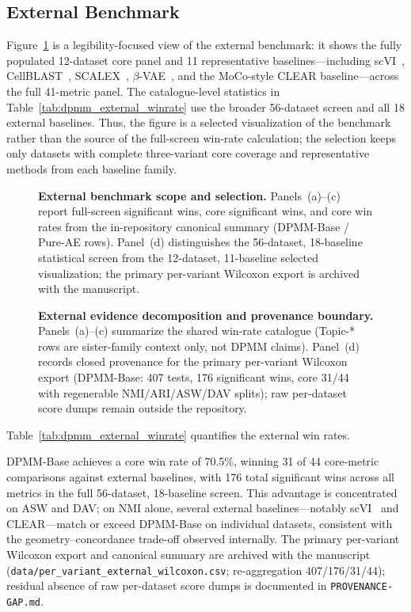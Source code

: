 \documentclass[biology,article,submit,pdftex,moreauthors]{Definitions/mdpi}
\begin{document}
\subsection{External Benchmark}
Figure~\ref{fig:external} is a legibility-focused view of the external benchmark: it shows the fully populated 12-dataset core panel and 11 representative baselines---including scVI~\cite{lopez2018deep}, CellBLAST~\cite{cao2020searching}, SCALEX~\cite{xiong2022online}, $\beta$-VAE~\cite{higgins2017beta}, and the MoCo-style CLEAR baseline---across the full 41-metric panel. The catalogue-level statistics in Table~\ref{tab:dpmm_external_winrate} use the broader 56-dataset screen and all 18 external baselines. Thus, the figure is a selected visualization of the benchmark rather than the source of the full-screen win-rate calculation; the selection keeps only datasets with complete three-variant core coverage and representative methods from each baseline family.

\begin{figure}[H]
\centering

\caption{\textbf{External benchmark scope and selection.} Panels~(a)--(c) report full-screen significant wins, core significant wins, and core win rates from the in-repository canonical summary (DPMM-Base / Pure-AE rows). Panel~(d) distinguishes the 56-dataset, 18-baseline statistical screen from the 12-dataset, 11-baseline selected visualization; the primary per-variant Wilcoxon export is archived with the manuscript.}
\label{fig:external}
\end{figure}

\begin{figure}[H]
\centering

\caption{\textbf{External evidence decomposition and provenance boundary.} Panels~(a)--(c) summarize the shared win-rate catalogue (Topic-* rows are sister-family context only, not DPMM claims). Panel~(d) records closed provenance for the primary per-variant Wilcoxon export (DPMM-Base: 407 tests, 176 significant wins, core 31/44 with regenerable NMI/ARI/ASW/DAV splits); raw per-dataset score dumps remain outside the repository.}
\label{fig:external-provenance}
\end{figure}

Table~\ref{tab:dpmm_external_winrate} quantifies the external win rates.



DPMM-Base achieves a core win rate of 70.5\%, winning 31 of 44 core-metric comparisons against external baselines, with 176 total significant wins across all metrics in the full 56-dataset, 18-baseline screen. This advantage is concentrated on ASW and DAV; on NMI alone, several external baselines---notably scVI~\cite{lopez2018deep} and CLEAR---match or exceed DPMM-Base on individual datasets, consistent with the geometry--concordance trade-off observed internally. The primary per-variant Wilcoxon export and canonical summary are archived with the manuscript (\texttt{data/per\_variant\_external\_wilcoxon.csv}; re-aggregation 407/176/31/44); residual absence of raw per-dataset score dumps is documented in \texttt{PROVENANCE-GAP.md}.
\end{document}
